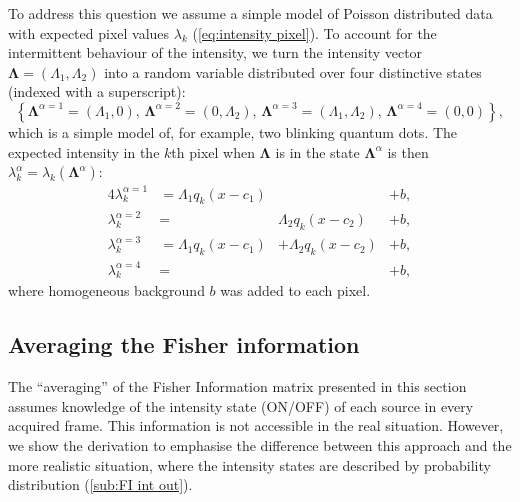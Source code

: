 To address this question we assume a simple model of Poisson distributed data with expected pixel values $\lambda_k$ (\autoref{eq:intensity pixel}). To account for the intermittent behaviour of the intensity, we turn the intensity vector $\bm{\Lambda}=(\Lambda_1,\Lambda_2)$ into a random variable distributed over four distinctive states (indexed with a superscript):
%
\begin{equation}
	\left\{ \bm{\Lambda}^{\alpha=1}=(\Lambda_1,0),\,\bm{\Lambda}^{\alpha=2}=(0,\Lambda_2),\,\bm{\Lambda}^{\alpha=3}=(\Lambda_1,\Lambda_2),\,\bm{\Lambda}^{\alpha=4}=(0,0)\right\},
	\label{eq:intensity states}
\end{equation}
%
which is a simple model of, for example, two blinking quantum dots. The expected intensity in the $k$th pixel when $\bm{\Lambda}$ is in the state $\bm{\Lambda}^\alpha$ is then $\lambda_k^\alpha=\lambda_k(\bm{\Lambda}^\alpha)$:
%
\begin{alignat}{4}
	\lambda_k^{\alpha=1}&=\Lambda_1q_k(x-c_1) & &+b,\nonumber\\ 
	\lambda_k^{\alpha=2}&=&\Lambda_2q_k(x-c_2) &+b,\nonumber\\ 
	\lambda_k^{\alpha=3}&=\Lambda_1q_k(x-c_1)&+\Lambda_2q_k(x-c_2)&+b,\nonumber\\ 
	\lambda_k^{\alpha=4}&=& &+b,
	\label{eq:lambda states}
\end{alignat}
%
where homogeneous background $b$ was added to each pixel.

\subsection{Averaging the Fisher information\label{sub:avg FI}}

The ``averaging'' of the Fisher Information matrix presented in this section assumes knowledge of the intensity state (ON/OFF) of each source in every acquired frame. This information is not accessible in the real situation. However, we show the derivation to emphasise the difference between this approach and the more realistic situation, where the intensity states are described by probability distribution (\autoref{sub:FI int out}). 

